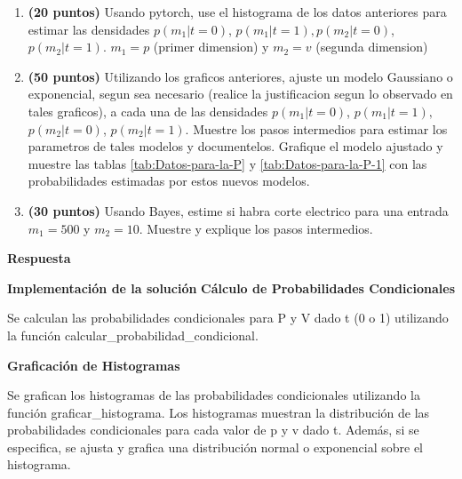 \documentclass[spanish]{article}
\begin{document}
\begin{enumerate}
\item \textbf{(20 puntos)} Usando pytorch, use el histograma de los datos
anteriores para estimar las densidades $p\left(m_{1}|t=0\right)$,
$p\left(m_{1}|t=1\right),$$p\left(m_{2}|t=0\right)$, $p\left(m_{2}|t=1\right)$.
$m_{1}=p$ (primer dimension) y $m_{2}=v$ (segunda dimension)
\item \textbf{(50 puntos)} Utilizando los graficos anteriores, ajuste un
modelo Gaussiano o exponencial, segun sea necesario (realice la justificacion
segun lo observado en tales graficos), a cada una de las densidades
$p\left(m_{1}|t=0\right)$, $p\left(m_{1}|t=1\right),$$p\left(m_{2}|t=0\right)$,
$p\left(m_{2}|t=1\right)$. Muestre los pasos intermedios para estimar
los parametros de tales modelos y documentelos. Grafique el modelo
ajustado y muestre las tablas \foreignlanguage{english}{\ref{tab:Datos-para-la-P}
y \ref{tab:Datos-para-la-P-1}} con las probabilidades estimadas por
estos nuevos modelos. 
\item \textbf{(30 puntos)} Usando Bayes, estime si habra corte electrico
para una entrada $m_{1}=500$ y $m_{2}=10$. Muestre y explique los
pasos intermedios.%
\end{enumerate}


\vspace{15px}
\textbf{Respuesta}

\vspace{15px}
\vspace{5px}
\textbf{Implementación de la solución}
\vspace{5px}
\textbf{Cálculo de Probabilidades Condicionales}
\par Se calculan las probabilidades condicionales para P y V dado t (0 o 1) utilizando la función calcular\_probabilidad\_condicional.
\vspace{5px}

\textbf{Graficación de Histogramas}

\par Se grafican los histogramas de las probabilidades condicionales utilizando la función graficar\_histograma. Los histogramas muestran la distribución de las probabilidades condicionales para cada valor de p y v dado t. Además, si se especifica, se ajusta y grafica una distribución normal o exponencial sobre el histograma.

\vspace{15px}
\end{document}
